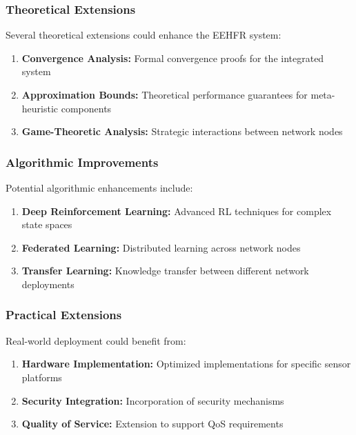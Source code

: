 \documentclass[conference]{IEEEtran}
\begin{document}
\subsubsection{Theoretical Extensions}

Several theoretical extensions could enhance the EEHFR system:

\begin{enumerate}
    \item \textbf{Convergence Analysis:} Formal convergence proofs for the integrated system
    \item \textbf{Approximation Bounds:} Theoretical performance guarantees for meta-heuristic components
    \item \textbf{Game-Theoretic Analysis:} Strategic interactions between network nodes
\end{enumerate}

\subsubsection{Algorithmic Improvements}

Potential algorithmic enhancements include:

\begin{enumerate}
    \item \textbf{Deep Reinforcement Learning:} Advanced RL techniques for complex state spaces
    \item \textbf{Federated Learning:} Distributed learning across network nodes
    \item \textbf{Transfer Learning:} Knowledge transfer between different network deployments
\end{enumerate}

\subsubsection{Practical Extensions}

Real-world deployment could benefit from:

\begin{enumerate}
    \item \textbf{Hardware Implementation:} Optimized implementations for specific sensor platforms
    \item \textbf{Security Integration:} Incorporation of security mechanisms
    \item \textbf{Quality of Service:} Extension to support QoS requirements
\end{enumerate}
\end{document}
